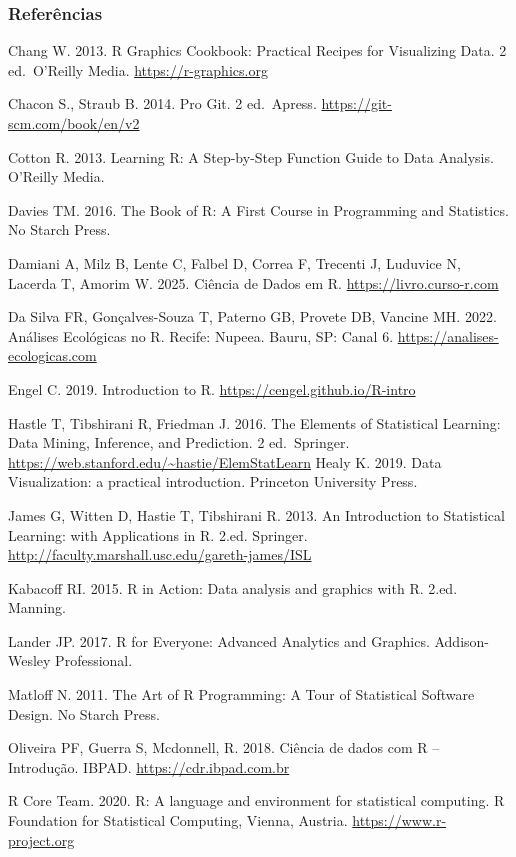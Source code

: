 \documentclass[
  letterpaper,
  DIV=11,
  numbers=noendperiod]{scrartcl}
\begin{document}
\subsubsection{Referências}\label{referuxeancias}

Chang W. 2013. R Graphics Cookbook: Practical Recipes for Visualizing
Data. 2 ed.~O'Reilly Media. \url{https://r-graphics.org}

Chacon S., Straub B. 2014. Pro Git. 2 ed.~Apress.
\url{https://git-scm.com/book/en/v2}

Cotton R. 2013. Learning R: A Step-by-Step Function Guide to Data
Analysis. O'Reilly Media.

Davies TM. 2016. The Book of R: A First Course in Programming and
Statistics. No Starch Press.

Damiani A, Milz B, Lente C, Falbel D, Correa F, Trecenti J, Luduvice N,
Lacerda T, Amorim W. 2025. Ciência de Dados em R.
\href{https://livro.curso-r.com/}{https://livro.curso-r.com}

Da Silva FR, Gonçalves-Souza T, Paterno GB, Provete DB, Vancine MH.
2022. Análises Ecológicas no R. Recife: Nupeea. Bauru, SP: Canal 6.
\url{https://analises-ecologicas.com}

Engel C. 2019. Introduction to R. \url{https://cengel.github.io/R-intro}

Hastle T, Tibshirani R, Friedman J. 2016. The Elements of Statistical
Learning: Data Mining, Inference, and Prediction. 2 ed.~Springer.
\url{https://web.stanford.edu/~hastie/ElemStatLearn} Healy K. 2019. Data
Visualization: a practical introduction. Princeton University Press.

James G, Witten D, Hastie T, Tibshirani R. 2013. An Introduction to
Statistical Learning: with Applications in R. 2.ed. Springer.
\url{http://faculty.marshall.usc.edu/gareth-james/ISL}

Kabacoff RI. 2015. R in Action: Data analysis and graphics with R. 2.ed.
Manning.

Lander JP. 2017. R for Everyone: Advanced Analytics and Graphics.
Addison-Wesley Professional.

Matloff N. 2011. The Art of R Programming: A Tour of Statistical
Software Design. No Starch Press.

Oliveira PF, Guerra S, Mcdonnell, R. 2018. Ciência de dados com R --
Introdução. IBPAD. \url{https://cdr.ibpad.com.br}

R Core Team. 2020. R: A language and environment for statistical
computing. R Foundation for Statistical Computing, Vienna, Austria.
\url{https://www.r-project.org}
\end{document}
